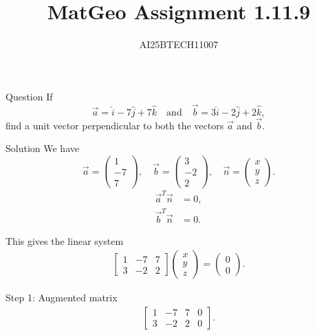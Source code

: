 \documentclass{beamer}
\title 
{MatGeo Assignment 1.11.9}
\author
{AI25BTECH11007}
\begin{document}
\frame{\titlepage}
\begin{frame}{Question}
If
\[
\vec{a} = \hat{i} - 7\hat{j} + 7\hat{k}
\quad \text{and} \quad
\vec{b} = 3\hat{i} - 2\hat{j} + 2\hat{k},
\]
find a unit vector perpendicular to both the vectors $\vec{a}$ and $\vec{b}$.\\
\end{frame}
\begin{frame}{Solution}
We have
\[
\vec{a} = \begin{pmatrix}1\\-7\\7\end{pmatrix}, 
\quad 
\vec{b} = \begin{pmatrix}3\\-2\\2\end{pmatrix}, 
\quad 
\vec{n} = \begin{pmatrix}x\\y\\z\end{pmatrix}.
\]
\begin{align}
\vec{a}^T \vec{n} &= 0, \label{eq:orth1}\\
\vec{b}^T \vec{n} &= 0. \label{eq:orth2}
\end{align}

This gives the linear system
\begin{align}
\begin{bmatrix}
1 & -7 & 7\\
3 & -2 & 2
\end{bmatrix}
\begin{pmatrix}x\\y\\z\end{pmatrix}
= \begin{pmatrix}0\\0\end{pmatrix}. \label{eq:system}
\end{align}

Step 1: Augmented matrix\\
\begin{align}
\left[\begin{array}{ccc|c}
1 & -7 & 7 & 0\\
3 & -2 & 2 & 0
\end{array}\right]. \label{eq:aug}
\end{align}
\end{frame}
\end{document}
